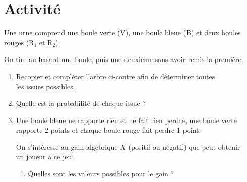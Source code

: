 \documentclass[11pt]{cornouaille}
\begin{document}

\section{Activité}

%
  Une urne comprend une boule verte (V), une boule bleue (B) et deux
  boules\\ rouges (R$_{1}$ et R$_{2}$).

  On tire au hasard une boule, puis une deuxi\`{e}me sans avoir remis la
  premi\`{e}re.   
  \begin{enumerate}
  \item Recopier et compl\'{e}ter l'arbre ci-contre afin de
    d\'{e}terminer toutes\\ les issues possibles.

  \item  Quelle est la probabilit\'{e} de chaque issue ?


  \vspace{-\baselineskip}

    \item  Une boule bleue ne rapporte rien et ne fait rien perdre, une boule verte\\
      rapporte 2 points et chaque boule rouge fait perdre 1 point.

    On s'int\'{e}resse au gain alg\'{e}brique $X$ (positif ou
    n\'{e}gatif) que peut obtenir\\ un joueur \`{a} ce jeu.
    \begin{enumerate}
    \item Quelles sont les valeurs possibles pour le gain ?
      


\end{enumerate}
\end{enumerate}
\end{document}
